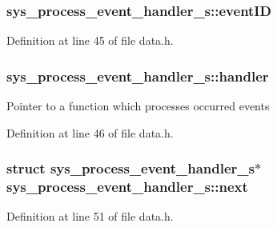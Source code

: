 \subsubsection[{event\+I\+D}]{ sys\+\_\+process\+\_\+event\+\_\+handler\+\_\+s\+::event\+I\+D}\label{structsys__process__event__handler__s_a4b799aaf40561daed132a1a1d688ecd8}


Definition at line 45 of file data.\+h.

\hypertarget{structsys__process__event__handler__s_a980eeb4cb54ac72cd3ebc38e391c40a5}{}
\subsubsection[{handler}]{ sys\+\_\+process\+\_\+event\+\_\+handler\+\_\+s\+::handler}\label{structsys__process__event__handler__s_a980eeb4cb54ac72cd3ebc38e391c40a5}
Pointer to a function which processes occurred events 

Definition at line 46 of file data.\+h.

\hypertarget{structsys__process__event__handler__s_abd718f866343f0a1e139c977bbae72b8}{}
\subsubsection[{next}]{\setlength{\rightskip}{0pt plus 5cm}struct {\bf sys\+\_\+process\+\_\+event\+\_\+handler\+\_\+s}$\ast$ sys\+\_\+process\+\_\+event\+\_\+handler\+\_\+s\+::next}\label{structsys__process__event__handler__s_abd718f866343f0a1e139c977bbae72b8}


Definition at line 51 of file data.\+h.

\hypertarget{structsys__process__event__handler__s_abbb4742265dace5feffc2a1b05d5271c}{}
